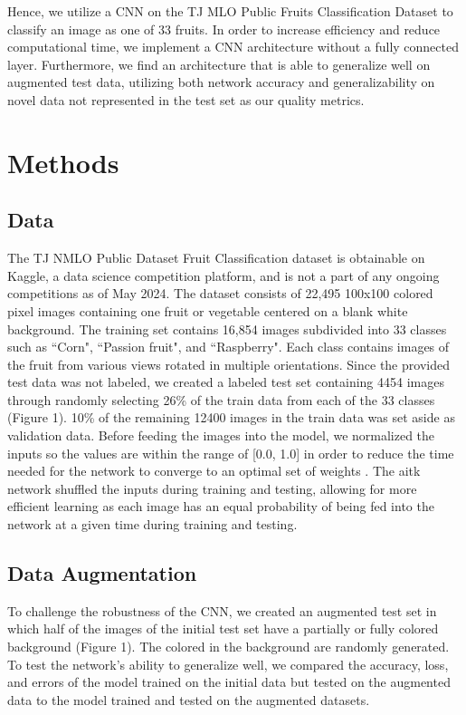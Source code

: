 \documentclass[11pt]{article}
\begin{document}
Hence, we utilize a CNN on the TJ MLO Public Fruits Classification Dataset to classify an image as one of 33 fruits. In order to increase efficiency and reduce computational time, we implement a CNN architecture without a fully connected layer. Furthermore, we find an architecture that is able to generalize well on augmented test data, utilizing both network accuracy and generalizability on novel data not represented in the test set as our quality metrics.

\section{Methods}
\subsection{Data}
The TJ NMLO Public Dataset Fruit Classification dataset \cite{fruit_classification} is obtainable on Kaggle, a data science competition platform, and is not a part of any ongoing competitions as of May 2024. The dataset consists of 22,495 100x100 colored pixel images containing one fruit or vegetable centered on a blank white background. The training set contains 16,854 images subdivided into 33 classes such as ``Corn", ``Passion fruit", and ``Raspberry". Each class contains images of the fruit from various views rotated in multiple orientations. Since the provided test data was not labeled, we created a labeled test set containing 4454 images through randomly selecting 26\% of the train data from each of the 33 classes (Figure 1). 10\% of the remaining 12400 images in the train data was set aside as validation data. 
Before feeding the images into the model, we normalized the inputs so the values are within the range of [0.0, 1.0] in order to reduce the time needed for the network to converge to an optimal set of weights \cite{krizhevsky2012imagenet}. The aitk network shuffled the inputs during training and testing, allowing for more efficient learning \cite{lecun1998efficientbackprop} as each image has an equal probability of being fed into the network at a given time during training and testing. 

\subsection{Data Augmentation}
To challenge the robustness of the CNN, we created an augmented test set in which half of the images of the initial test set have a partially or fully colored background (Figure 1). The colored in the background are randomly generated. To test the network's ability to generalize well, we compared the accuracy, loss, and errors of the model trained on the initial data but tested on the augmented data to the model trained and tested on the augmented datasets.  
\end{document}
